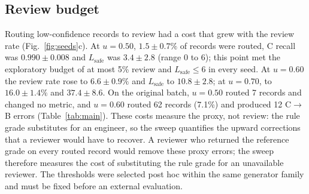 \documentclass[journal]{IEEEtran}
\newcommand{\CtoB}{C$\rightarrow$B}
\newcommand{\Lsafe}{L_{\mathrm{safe}}}
\begin{document}
\subsection{Review budget}
\label{sec:res-review}
Routing low-confidence records to review had a cost that grew with the review rate (Fig.~\ref{fig:seeds}c). At $u=0.50$, $1.5\pm0.7\%$ of records were routed, C recall was $0.990\pm0.008$ and $\Lsafe$ was $3.4\pm2.8$ (range 0 to 6); this point met the exploratory budget of at most 5\% review and $\Lsafe\leq6$ in every seed. At $u=0.60$ the review rate rose to $6.6\pm0.9\%$ and $\Lsafe$ to $10.8\pm2.8$; at $u=0.70$, to $16.0\pm1.4\%$ and $37.4\pm8.6$. On the original batch, $u=0.50$ routed 7 records and changed no metric, and $u=0.60$ routed 62 records (7.1\%) and produced 12 \CtoB{} errors (Table~\ref{tab:main}). These costs measure the proxy, not review: the rule grade substitutes for an engineer, so the sweep quantifies the upward corrections that a reviewer would have to recover. A reviewer who returned the reference grade on every routed record would remove these proxy errors; the sweep therefore measures the cost of substituting the rule grade for an unavailable reviewer. The thresholds were selected post hoc within the same generator family and must be fixed before an external evaluation.
\end{document}
